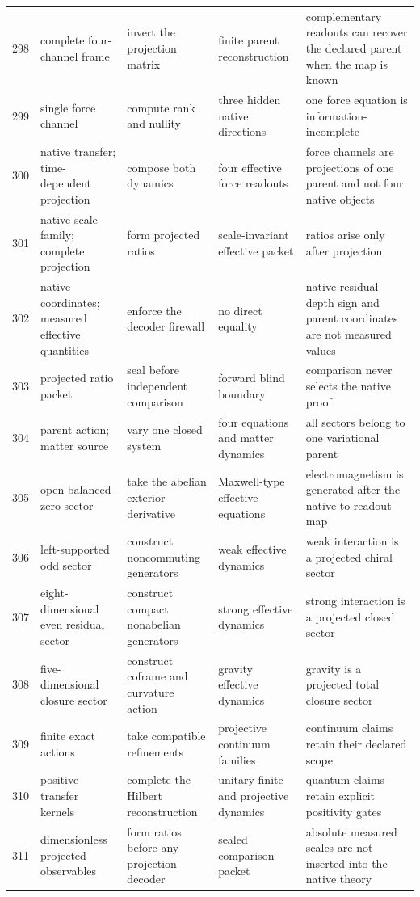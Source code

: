 \documentclass[11pt]{article}
\numberwithin{equation}{section}
\theoremstyle{remark}
\begin{document}
\begin{landscape}
\begin{longtable}{p{0.65cm}p{3.5cm}p{4.0cm}p{4.0cm}p{4.6cm}}
298&complete four-channel frame&invert the projection matrix&finite parent reconstruction&complementary readouts can recover the declared parent when the map is known\\
299&single force channel&compute rank and nullity&three hidden native directions&one force equation is information-incomplete\\
300&native transfer; time-dependent projection&compose both dynamics&four effective force readouts&force channels are projections of one parent and not four native objects\\
301&native scale family; complete projection&form projected ratios&scale-invariant effective packet&ratios arise only after projection\\
302&native coordinates; measured effective quantities&enforce the decoder firewall&no direct equality&native residual depth sign and parent coordinates are not measured values\\
303&projected ratio packet&seal before independent comparison&forward blind boundary&comparison never selects the native proof\\
304&parent action; matter source&vary one closed system&four equations and matter dynamics&all sectors belong to one variational parent\\
305&open balanced zero sector&take the abelian exterior derivative&Maxwell-type effective equations&electromagnetism is generated after the native-to-readout map\\
306&left-supported odd sector&construct noncommuting generators&weak effective dynamics&weak interaction is a projected chiral sector\\
307&eight-dimensional even residual sector&construct compact nonabelian generators&strong effective dynamics&strong interaction is a projected closed sector\\
308&five-dimensional closure sector&construct coframe and curvature action&gravity effective dynamics&gravity is a projected total closure sector\\
309&finite exact actions&take compatible refinements&projective continuum families&continuum claims retain their declared scope\\
310&positive transfer kernels&complete the Hilbert reconstruction&unitary finite and projective dynamics&quantum claims retain explicit positivity gates\\
311&dimensionless projected observables&form ratios before any projection decoder&sealed comparison packet&absolute measured scales are not inserted into the native theory\\

\end{longtable}
\end{landscape}
\end{document}
